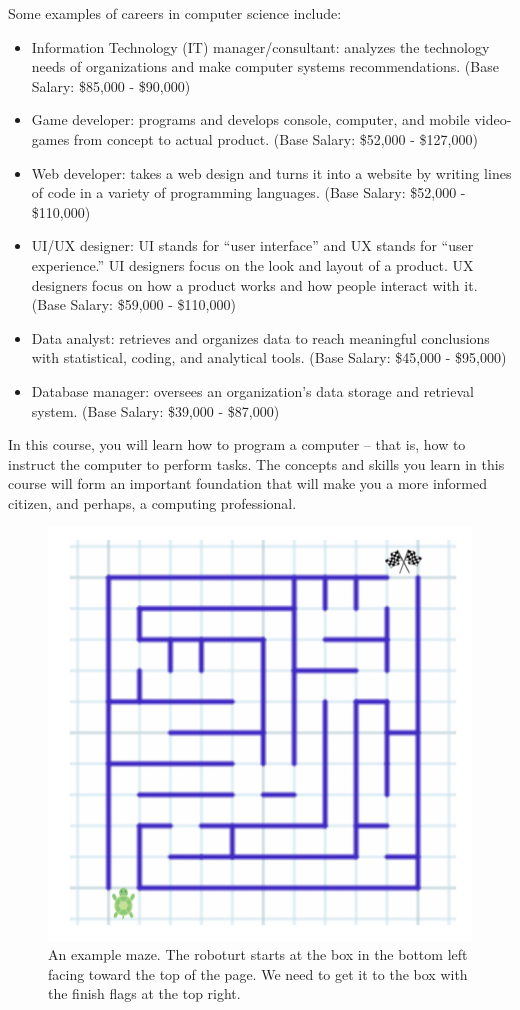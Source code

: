 Some examples of careers in computer science include:

\begin{itemize}
\item Information Technology (IT) manager/consultant: analyzes the technology needs of organizations and make computer systems recommendations. (Base Salary: \$85,000 - \$90,000)
\item Game developer: programs and develops console, computer, and mobile video-games from concept to actual product. (Base Salary: \$52,000 - \$127,000)
\item Web developer: takes a web design and turns it into a website by writing lines of code in a variety of programming languages. (Base Salary: \$52,000 - \$110,000)
\item UI/UX designer: UI stands for “user interface” and UX stands for “user experience.” UI designers focus on the look and layout of a product. UX designers focus on how a product works and how people interact with it. (Base Salary: \$59,000 - \$110,000)
\item Data analyst: retrieves and organizes data to reach meaningful conclusions with statistical, coding, and analytical tools. (Base Salary: \$45,000 - \$95,000)
\item Database manager: oversees an organization's data storage and retrieval system. (Base Salary: \$39,000 - \$87,000)
\end{itemize}
In this course, you will learn how to program a computer -- that is, how to instruct the computer to perform tasks. The concepts and skills you learn in this course will form an important foundation that will make you a more informed citizen, and perhaps, a computing professional. 

\exercisesection

\begin{figure}
  \centering
    \includegraphics[width=.32\textwidth]{images/maze_example}
    \caption{An example maze. The roboturt starts at the box in the bottom left facing toward the top of the page. We need to get it to the box with the finish flags at the top right.}
    \label{fig:graph-paper}
\end{figure}

